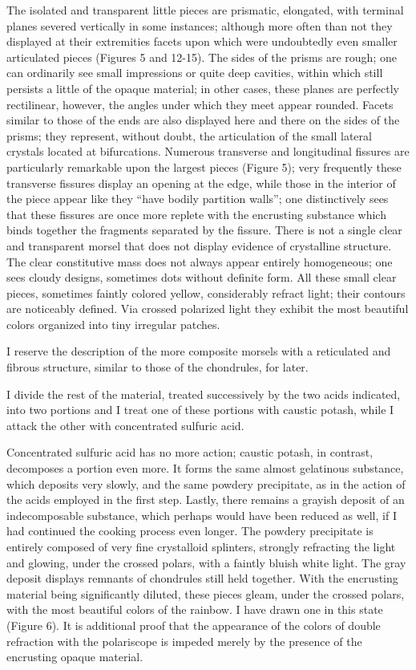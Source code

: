 \documentclass[a4paper, 12pt, oneside]{article}
\begin{document}
The isolated and transparent little pieces are prismatic, elongated, with terminal planes severed vertically in some instances; although more often than not they displayed at their extremities facets upon which were undoubtedly even smaller articulated pieces (Figures 5 and 12-15). The sides of the prisms are rough; one can ordinarily see small impressions or quite deep cavities, within which still persists a little of the opaque material; in other cases, these planes are perfectly rectilinear, however, the angles under which they meet appear rounded. Facets similar to those of the ends are also displayed here and there on the sides of the prisms; they represent, without doubt, the articulation of the small lateral crystals located at bifurcations. Numerous transverse and longitudinal fissures are particularly remarkable upon the largest pieces (Figure 5); very frequently these transverse fissures display an opening at the edge, while those in the interior of the piece appear like they ``have bodily partition walls''; one distinctively sees that these fissures are once more replete with the encrusting substance which binds together the fragments separated by the fissure. There is not a single clear and transparent morsel that does not display evidence of crystalline structure. The clear constitutive mass does not always appear entirely homogeneous; one sees cloudy designs, sometimes dots without definite form. All these small clear pieces, sometimes faintly colored yellow, considerably refract light; their contours are noticeably defined. Via crossed polarized light they exhibit the most beautiful colors organized into tiny irregular patches.

I reserve the description of the more composite morsels with a reticulated and fibrous structure, similar to those of the chondrules, for later.

I divide the rest of the material, treated successively by the two acids indicated, into two portions and I treat one of these portions with caustic potash, while I attack the other with concentrated sulfuric acid.

Concentrated sulfuric acid has no more action; caustic potash, in contrast, decomposes a portion even more. It forms the same almost gelatinous substance, which deposits very slowly, and the same powdery precipitate, as in the action of the acids employed in the first step. Lastly, there remains a grayish deposit of an indecomposable substance, which perhaps would have been reduced as well, if I had continued the cooking process even longer. The powdery precipitate is entirely composed of very fine crystalloid splinters, strongly refracting the light and glowing, under the crossed polars, with a faintly bluish white light. The gray deposit displays remnants of chondrules still held together. With the encrusting material being significantly diluted, these pieces gleam, under the crossed polars, with the most beautiful colors of the rainbow. I have drawn one in this state (Figure 6). It is additional proof that the appearance of the colors of double refraction with the polariscope is impeded merely by the presence of the encrusting opaque material.
\end{document}
